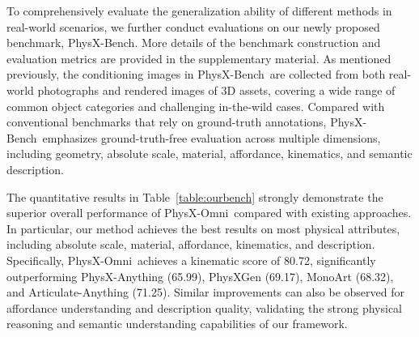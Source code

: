 \documentclass[11pt]{article}
\def\ourname{PhysX-Omni}
\def\ourbench{PhysX-Bench}
\begin{document}
To comprehensively evaluate the generalization ability of different methods in real-world scenarios, we further conduct evaluations on our newly proposed benchmark, \ourbench. More details of the benchmark construction and evaluation metrics are provided in the supplementary material. As mentioned previously, the conditioning images in \ourbench\ are collected from both real-world photographs and rendered images of 3D assets, covering a wide range of common object categories and challenging in-the-wild cases. Compared with conventional benchmarks that rely on ground-truth annotations, \ourbench\ emphasizes ground-truth-free evaluation across multiple dimensions, including geometry, absolute scale, material, affordance, kinematics, and semantic description.

The quantitative results in Table~\ref{table:ourbench} strongly demonstrate the superior overall performance of \ourname\ compared with existing approaches. In particular, our method achieves the best results on most physical attributes, including absolute scale, material, affordance, kinematics, and description. Specifically, \ourname\ achieves a kinematic score of 80.72, significantly outperforming PhysX-Anything (65.99), PhysXGen (69.17), MonoArt (68.32), and Articulate-Anything (71.25). Similar improvements can also be observed for affordance understanding and description quality, validating the strong physical reasoning and semantic understanding capabilities of our framework.
\end{document}
